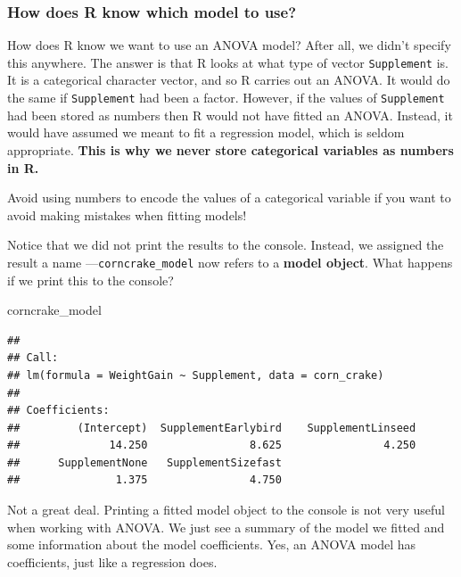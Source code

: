 \documentclass[
]{book}
\newenvironment{Shaded}{\begin{snugshade}}{\end{snugshade}}
\newcommand{\NormalTok}[1]{#1}
\newenvironment{greybox}{
  \definecolor{shadecolor}{rgb}{0.95,0.95,0.95}  %
  \color{black}
  \begin{shaded}}
 {\end{shaded}}
\newenvironment{infobox}[1]
  {
  \begin{itemize}
  \renewcommand{\labelitemi}{
    \raisebox{-.7\height}[0pt][0pt]{
      {\setkeys{Gin}{width=3em,keepaspectratio}
        \texttt{[image: images/\#1]}}
    }
  }
  \setlength{\fboxsep}{1em}
  \begin{greybox}
  \item
  }
  {
  \end{greybox}
  \end{itemize}
  }
\begin{document}
\begin{infobox}{information}

\hypertarget{how-does-r-know-which-model-to-use}{%
\subsubsection*{How does R know which model to use?}\label{how-does-r-know-which-model-to-use}}

How does R know we want to use an ANOVA model? After all, we didn't specify this anywhere. The answer is that R looks at what type of vector \texttt{Supplement} is. It is a categorical character vector, and so R carries out an ANOVA. It would do the same if \texttt{Supplement} had been a factor. However, if the values of \texttt{Supplement} had been stored as numbers then R would not have fitted an ANOVA. Instead, it would have assumed we meant to fit a regression model, which is seldom appropriate. \textbf{This is why we never store categorical variables as numbers in R.}

Avoid using numbers to encode the values of a categorical variable if you want to avoid making mistakes when fitting models!

\end{infobox}

Notice that we did not print the results to the console. Instead, we assigned the result a name ---\texttt{corncrake\_model} now refers to a \textbf{model object}. What happens if we print this to the console?

\begin{Shaded}
\begin{Highlighting}[]
\NormalTok{corncrake\_model}
\end{Highlighting}
\end{Shaded}

\begin{verbatim}
## 
## Call:
## lm(formula = WeightGain ~ Supplement, data = corn_crake)
## 
## Coefficients:
##         (Intercept)  SupplementEarlybird    SupplementLinseed  
##              14.250                8.625                4.250  
##      SupplementNone   SupplementSizefast  
##               1.375                4.750
\end{verbatim}

Not a great deal. Printing a fitted model object to the console is not very useful when working with ANOVA. We just see a summary of the model we fitted and some information about the model coefficients. Yes, an ANOVA model has coefficients, just like a regression does.
\end{document}
